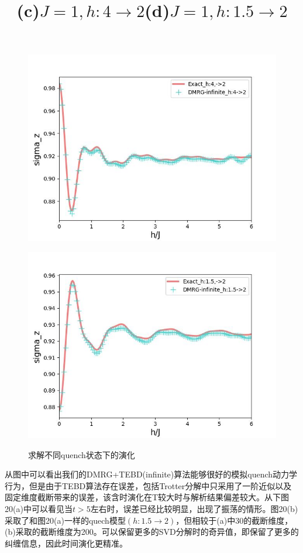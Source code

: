 \documentclass[12pt]{article}
\begin{document}
\begin{figure}[H]
     	\begin{minipage}{0.49\linewidth}
     		\centering
     		\includegraphics[width=0.9\linewidth]{TFIMSzt3}
     		\title{(c)$J=1,h:4\to2$}
     		\label{fig:22}
     	\end{minipage}
     	\begin{minipage}{0.49\linewidth}
     		\centering
     		\includegraphics[width=0.9\linewidth]{TFIMSzt4}
     		\title{(d)$J=1,h:1.5\to2$}
     		\label{fig:23}
     	\end{minipage}
       \caption[9pt]{求解不同quench状态下的演化}
     \end{figure}
    从图中可以看出我们的DMRG+TEBD(infinite)算法能够很好的模拟quench动力学行为，但是由于TEBD算法存在误差，包括Trotter分解中只采用了一阶近似以及固定维度截断带来的误差，该含时演化在T较大时与解析结果偏差较大。从下图20(a)中可以看见当$t>5$左右时，误差已经比较明显，出现了振荡的情形。图20(b)采取了和图20(a)一样的quech模型$(h:1.5\to2)$，但相较于(a)中30的截断维度，(b)采取的截断维度为200。可以保留更多的SVD分解时的奇异值，即保留了更多的纠缠信息，因此时间演化更精准。
         
\end{document}
